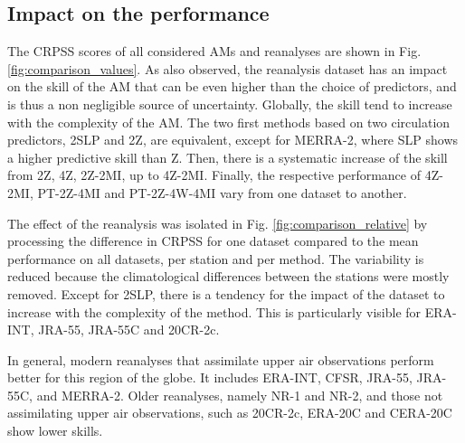 \documentclass{ametsoc}
\begin{document}
\subsection{Impact on the performance}

The CRPSS scores of all considered AMs and reanalyses are shown in Fig. \ref{fig:comparison_values}. As \citet{Dayon2015} also observed, the reanalysis dataset has an impact on the skill of the AM that can be even higher than the choice of predictors, and is thus a non negligible source of uncertainty. Globally, the skill tend to increase with the complexity of the AM. The two first methods based on two circulation predictors, 2SLP and 2Z, are equivalent, except for MERRA-2, where SLP shows a higher predictive skill than Z. Then, there is a systematic increase of the skill from 2Z, 4Z, 2Z-2MI, up to 4Z-2MI. Finally, the respective performance of 4Z-2MI, PT-2Z-4MI and PT-2Z-4W-4MI vary from one dataset to another. 

The effect of the reanalysis was isolated in Fig. \ref{fig:comparison_relative} by processing the difference in CRPSS for one dataset compared to the mean performance on all datasets, per station and per method. The variability is reduced because the climatological differences between the stations were mostly removed. Except for 2SLP, there is a tendency for the impact of the dataset to increase with the complexity of the method. This is particularly visible for ERA-INT, JRA-55, JRA-55C and 20CR-2c. 

In general, modern reanalyses that assimilate upper air observations perform better for this region of the globe. It includes ERA-INT, CFSR, JRA-55, JRA-55C, and MERRA-2. Older reanalyses, namely NR-1 and NR-2, and those not assimilating upper air observations, such as 20CR-2c, ERA-20C and CERA-20C show lower skills.
\end{document}
